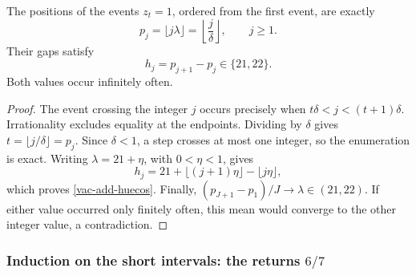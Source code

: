 \begin{theorem}
\label{vac-add-teorema-primario}
The positions of the events \(z_t=1\), ordered from the first event, are exactly
\begin{equation}
 p_j=\lfloor j\lambda\rfloor
     =\left\lfloor\frac j\delta\right\rfloor,
 \qquad j\geq1.
 \label{vac-add-posiciones}
\end{equation}
Their gaps satisfy
\begin{equation}
 h_j=p_{j+1}-p_j\in\{21,22\}.
 \label{vac-add-huecos}
\end{equation}
Both values occur infinitely often.
\end{theorem}
\begin{proof}
The event crossing the integer \(j\) occurs precisely when \(t\delta<j<(t+1)\delta\). Irrationality excludes equality at the endpoints. Dividing by \(\delta\) gives \(t=\lfloor j/\delta\rfloor=p_j\). Since \(\delta<1\), a step crosses at most one integer, so the enumeration is exact. Writing \(\lambda=21+\eta\), with \(0<\eta<1\), gives
\[
 h_j=21+\lfloor(j+1)\eta\rfloor-\lfloor j\eta\rfloor,
\]
which proves \eqref{vac-add-huecos}. Finally, \((p_{J+1}-p_1)/J\to\lambda\in(21,22)\). If either value occurred only finitely often, this mean would converge to the other integer value, a contradiction.
\end{proof}

\subsubsection{Induction on the short intervals: the returns \(6/7\)}
\label{vac-add-secundarios}

